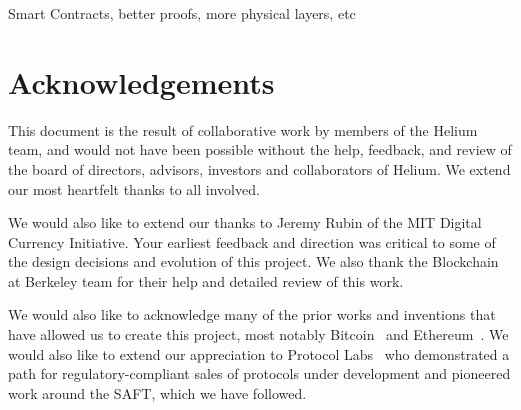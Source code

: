 \documentclass[letterpaper,11pt]{article}
\begin{document}
Smart Contracts, better proofs, more physical layers, etc

\newpage

\section{Acknowledgements}

This document is the result of collaborative work by members of the Helium team, and would not have been possible without the help, feedback, and review of the board of directors, advisors, investors and collaborators of Helium. We extend our most heartfelt thanks to all involved.

We would also like to extend our thanks to Jeremy Rubin of the MIT Digital Currency Initiative. Your earliest feedback and direction was critical to some of the design decisions and evolution of this project. We also thank the Blockchain at Berkeley team for their help and detailed review of this work.

We would also like to acknowledge many of the prior works and inventions that have allowed us to create this project, most notably Bitcoin~\cite{bitcoin} and Ethereum~\cite{ethereum}. We would also like to extend our appreciation to Protocol Labs~\cite{protocol} who demonstrated a path for regulatory-compliant sales of protocols under development and pioneered work around the SAFT, which we have followed.
\newpage
\end{document}
